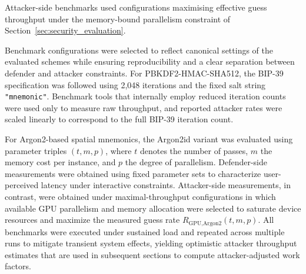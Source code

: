 \documentclass[journal,article,submit,pdftex,moreauthors]{Definitions/mdpi}
\newcommand{\add}[1]{#1}
\newcommand{\remove}[1]{}
\newcommand{\add}[1]{\added{#1}}
\newcommand{\remove}[1]{\deleted{#1}}
\begin{document}
\remove{Attacker-side benchmarks were conducted on a high-end GPU representative of a realistic, well-provisioned offline adversary, consistent with the attacker model defined in Section~\ref{sec:security_evaluation}. For fast hash functions such as SHA-256, attacker throughput is primarily compute-bound and scales efficiently with available parallel execution units. In contrast, for memory-hard key derivation functions such as Argon2id, scalability is fundamentally constrained by available high-bandwidth device memory. Given a per-instance memory cost $m$ and total GPU memory $M_{\text{GPU}}$, the maximum number of fully independent parallel Argon2 evaluations is upper-bounded by $P_{\max} = \lfloor M_{\text{GPU}}/m \rfloor$. Once this bound is reached, additional compute resources cannot be exploited to increase throughput, and attacker performance becomes memory-bound rather than compute-bound. All attacker-side measurements therefore reflect configurations chosen to maximize effective guess throughput, corresponding to a near-worst-case attacker from the defender’s perspective.}%
\add{Attacker-side benchmarks used configurations maximising effective guess throughput under the memory-bound parallelism constraint of Section~\ref{sec:security_evaluation}.}

Benchmark configurations were selected to reflect canonical settings of the evaluated schemes while ensuring reproducibility and a clear separation between defender and attacker constraints. For PBKDF2-HMAC-SHA512, the BIP-39 specification was followed using 2,048 iterations and the fixed salt string \texttt{"mnemonic"}. Benchmark tools that internally employ reduced iteration counts were used only to measure raw throughput, and reported attacker rates were scaled linearly to correspond to the full BIP-39 iteration count.

For Argon2-based spatial mnemonics, the Argon2id variant was evaluated using parameter triples $(t,m,p)$, where $t$ denotes the number of passes, $m$ the memory cost per instance, and $p$ the degree of parallelism. Defender-side measurements were obtained using fixed parameter sets to characterize user-perceived latency under interactive constraints. Attacker-side measurements, in contrast, were obtained under maximal-throughput configurations in which available GPU parallelism and memory allocation were selected to saturate device resources and maximize the measured guess rate $R_{\text{GPU,Argon2}}(t,m,p)$. All benchmarks were executed under sustained load and repeated across multiple runs to mitigate transient system effects, yielding optimistic attacker throughput estimates that are used in subsequent sections to compute attacker-adjusted work factors.
\end{document}
